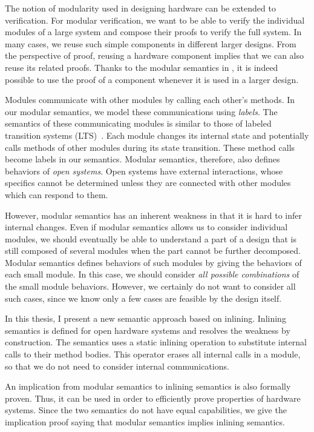 The notion of modularity used in designing hardware can be extended to
verification. For modular verification, we want to be able to verify
the individual modules of a large system and compose their proofs to
verify the full system. In many cases, we reuse such simple components
in different larger designs. From the perspective of proof, reusing a
hardware component implies that we can also reuse its related
proofs. Thanks to the modular semantics in \Kami{}, it is indeed
possible to use the proof of a component whenever it is used in a
larger design.

Modules communicate with other modules by calling each other's
methods. In our modular semantics, we model these communications using
\emph{labels}. The semantics of these communicating modules is similar
to those of labeled transition systems (LTS)~\cite{lts}. Each module
changes its internal state and potentially calls methods of other
modules during its state transition. These method calls become labels
in our semantics. Modular semantics, therefore, also defines behaviors
of \emph{open systems}. Open systems have external interactions, whose
specifics cannot be determined unless they are connected with other
modules which can respond to them.

However, modular semantics has an inherent weakness in that it is hard
to infer internal changes. Even if modular semantics allows us to
consider individual modules, we should eventually be able to
understand a part of a design that is still composed of several
modules when the part cannot be further decomposed. Modular semantics
defines behaviors of such modules by giving the behaviors of each
small module. In this case, we should consider \emph{all possible
  combinations} of the small module behaviors. However, we certainly
do not want to consider all such cases, since we know only a few cases
are feasible by the design itself.

In this thesis, I present a new semantic approach based on inlining.
Inlining semantics is defined for open hardware systems and resolves
the weakness by construction. The semantics uses a static inlining
operation to substitute internal calls to their method bodies. This
operator erases all internal calls in a module, so that we do not need
to consider internal communications.

An implication from modular semantics to inlining semantics is also
formally proven. Thus, it can be used in order to efficiently prove
properties of hardware systems. Since the two semantics do not have
equal capabilities, we give the implication proof saying that modular
semantics implies inlining semantics.

